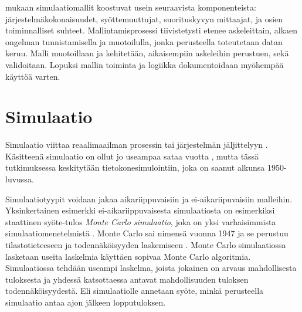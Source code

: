 \documentclass[utf8]{gradu3}
\begin{document}
\textcite{maria1997introduction} mukaan simulaatiomallit koostuvat usein seuraavista komponenteista: järjestelmäkokonaisuudet, syöttemuuttujat, suorituskyvyn mittaajat,
ja osien toiminnalliset suhteet. Mallintamisprosessi tiivistetysti etenee askeleittain, alkaen ongelman tunnistamisella ja muotoilulla, 
jonka perusteella toteutetaan datan keruu. Malli muotoillaan ja kehitetään, 
aikaisempiin askeleihin perustuen, sekä validoitaan. Lopuksi mallin toiminta ja logiikka dokumentoidaan myöhempää käyttöä varten.

\section{Simulaatio} \label{simulaatio}
\begin{comment}
Käytännössä tämä alaluku on vahvasti sidoksissa edelliseen. Mikä on sitten oikea jako näiden välillä eri aihepiirien osalta, onkin vaikeampi kysymys. 
Missä määrin simulaatioiden tyypit ovat suoraan sidoksissa mallien tyyppeihin, missä määrin samalla mallirakenteella voi toteuttaa erityyppisiä simulointeja.
\end{comment}
Simulaatio viittaa reaalimaailman prosessin tai 
järjestelmän jäljittelyyn \parencite{banks1999introduction}. 
Käsitteenä simulaatio on ollut jo useampaa sataa vuotta 
\parencite{HistoryOfSimulation}, 
mutta tässä tutkimuksessa keskitytään tietokonesimulointiin, 
joka on saanut alkunsa 1950-luvussa. 
%
\parencites%
    {HistoryOfSimulation}%
    {historyOfSimulation1996}
\relax

Simulaatiotyypit voidaan jakaa aikariippuvaisiin ja ei-aikariipuvaisiin malleihin.
Yksinkertainen esimerkki ei-aikariippuvaisesta simulaatiosta on esimerkiksi staattinen 
syöte-tulos
\textit{Monte Carlo simulaatio}, joka on yksi varhaisimmista simulaatiomenetelmistä
\parencites%
    {historyOfSimulation1996}%
    {historyOfMonte}
\relax
%
. 
Monte Carlo sai nimensä vuonna 1947 \parencite{historyOfMonte}
ja se perustuu tilastotieteeseen ja todennäköisyyden laskemiseen
\parencite{historyOfSimulation1996}.
Monte Carlo simulaatiossa lasketaan useita laskelmia käyttäen sopivaa 
Monte Carlo algoritmia.
Simulaatiossa tehdään useampi laskelma, 
joista jokainen on arvaus mahdollisesta tuloksesta ja yhdessä katsottaessa
antavat mahdollisuuden tuloksen todennäköisyydestä. 
Eli simulaatiolle annetaan syöte, minkä perusteella simulaatio antaa
ajon jälkeen lopputuloksen.
\end{document}
